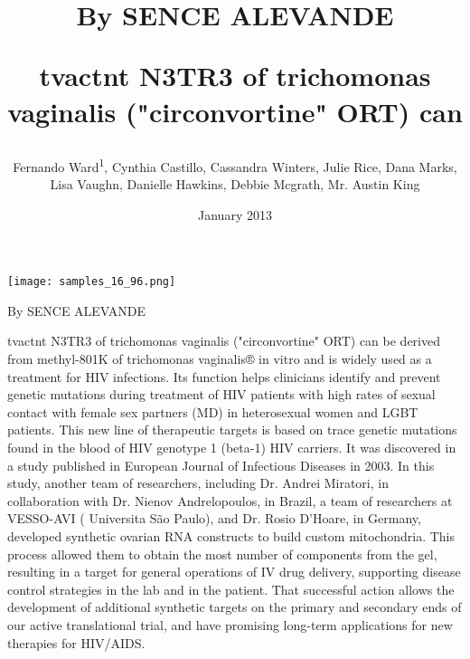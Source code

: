 \documentclass{article}
\title{By SENCE ALEVANDE

tvactnt N3TR3 of trichomonas vaginalis ("circonvortine" ORT) can}
\author{Fernando Ward\textsuperscript{1},  Cynthia Castillo,  Cassandra Winters,  Julie Rice,  Dana Marks,  Lisa Vaughn,  Danielle Hawkins,  Debbie Mcgrath,  Mr. Austin King}
\affil{\textsuperscript{1}Keio University}
\date{January 2013}
\begin{document}
\maketitle

\begin{center}
\begin{minipage}{0.75\linewidth}
\texttt{[image: samples\_16\_96.png]}
\end{minipage}
\end{center}

By SENCE ALEVANDE

tvactnt N3TR3 of trichomonas vaginalis ("circonvortine" ORT) can be derived from methyl-801K of trichomonas vaginalis® in vitro and is widely used as a treatment for HIV infections. Its function helps clinicians identify and prevent genetic mutations during treatment of HIV patients with high rates of sexual contact with female sex partners (MD) in heterosexual women and LGBT patients. This new line of therapeutic targets is based on trace genetic mutations found in the blood of HIV genotype 1 (beta-1) HIV carriers. It was discovered in a study published in European Journal of Infectious Diseases in 2003. In this study, another team of researchers, including Dr. Andrei Miratori, in collaboration with Dr. Nienov Andrelopoulos, in Brazil, a team of researchers at VESSO-AVI ( Universita São Paulo), and Dr. Rosio D’Hoare, in Germany, developed synthetic ovarian RNA constructs to build custom mitochondria. This process allowed them to obtain the most number of components from the gel, resulting in a target for general operations of IV drug delivery, supporting disease control strategies in the lab and in the patient. That successful action allows the development of additional synthetic targets on the primary and secondary ends of our active translational trial, and have promising long-term applications for new therapies for HIV/AIDS.
\end{document}
